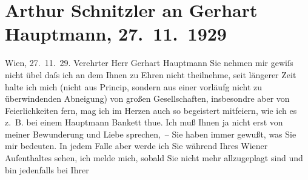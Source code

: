 

         
         \renewcommand{\erwaehntePersonen}{Personen: Gerhart Hauptmann, Margarete Hauptmann}
         \renewcommand{\erwaehnteOrte}{Orte: Wien}
         \renewcommand{\erwaehnteWerke}{Werke: Spuk}
               \section[Arthur Schnitzler an Gerhart Hauptmann, 27. 11. 1929]{ Arthur Schnitzler an Gerhart Hauptmann, 27. 11. 1929}\nopagebreak{}\rehead{ }\begin{ledgroupsized}[t]{13cm}\normalsize\beginnumbering \toendnotes[C]{\smallbreak\pagebreak[2]} 
\toendnotes[C]{\smallbreak}\pstart
           \raggedleft{}{\pb}Wien, 27. 11. 29.\pend
           \pstart{}Verehrter Herr Gerhart Hauptmann\pend\pstart
           Sie nehmen mir gewiſs nicht übel daſs ich an dem \label{K_L02526-1v}\label{K_L02526-1h} Ihnen zu Ehren nicht theilnehme, seit
               längerer Zeit halte ich mich (nicht aus Princip, sondern aus einer vorläufg nicht zu
               überwindenden Abneigung) von großen Gesellschaften, insbesondre aber von
               Feierlichkeiten fern, mag ich im Herzen auch so begeistert mitfeiern, wie ich es
               z. B. bei einem Hauptmann Bankett thue. Ich muß Ihnen ja nicht erst von meiner
               Bewunderung und Liebe sprechen, – Sie haben immer gewußt, was Sie {\pb}mir bedeuten. \pend
           \pstart
           In jedem Falle aber werde ich Sie während Ihres Wiener Aufenthaltes sehen, ich melde mich, sobald Sie nicht mehr
               allzugeplagt sind und bin jedenfalls bei Ihrer \label{K_L02526-2v}
\end{ledgroupsized}
